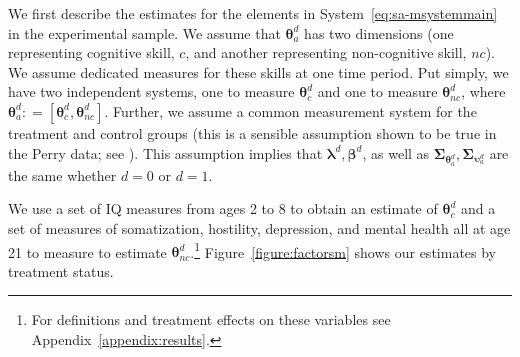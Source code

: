 \noindent We first describe the estimates for the elements in System~\eqref{eq:sa-msystemmain} in the experimental sample. We assume that $\bm{\theta}_{a}^d$ has two dimensions (one representing cognitive skill, $c$, and another representing non-cognitive skill, $nc$). We assume dedicated measures for these skills at one time period. Put simply, we have two independent systems, one to measure $\bm{\theta}_{c}^d$ and one to measure $\bm{\theta}_{nc}^d$, where $\bm{\theta}_{a}^d: = \left[ \bm{\theta}_{c}^d, \bm{\theta}_{nc}^d \right]$. Further, we assume a common measurement system for the treatment and control groups (this is a sensible assumption shown to be true in the Perry data; see \citealp{Heckman_Pinto_etal_2013_PerryFactor}). This assumption implies that $\bm{\lambda}^d, \bm{\beta}^d$, as well as $\bm{\Sigma}_{\bm{\theta}_{a}^d}, \bm{\Sigma}_{\bm{\upsilon}_{a}^d}$ are the same whether $d = 0$ or $d = 1$.

\noindent We use a set of IQ measures from ages 2 to 8 to obtain an estimate of $\bm{\theta}_{c}^d$ and a set of measures of somatization, hostility, depression, and mental health all at age 21 to measure to estimate $\bm{\theta}_{nc}^d$.\footnote{For definitions and treatment effects on these variables see Appendix~\ref{appendix:results}.} Figure~\ref{figure:factorsm} shows our estimates by treatment status.

